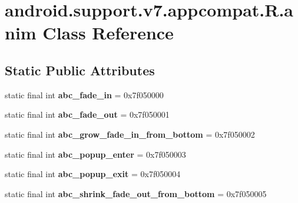 \hypertarget{classandroid_1_1support_1_1v7_1_1appcompat_1_1_r_1_1anim}{}\section{android.\+support.\+v7.\+appcompat.\+R.\+anim Class Reference}
\label{classandroid_1_1support_1_1v7_1_1appcompat_1_1_r_1_1anim}
\subsection*{Static Public Attributes}
\begin{DoxyCompactItemize}
\item 
\hypertarget{classandroid_1_1support_1_1v7_1_1appcompat_1_1_r_1_1anim_a665e81e9b94944163fe09d845ed3acb4}{}static final int {\bfseries abc\+\_\+fade\+\_\+in} = 0x7f050000\label{classandroid_1_1support_1_1v7_1_1appcompat_1_1_r_1_1anim_a665e81e9b94944163fe09d845ed3acb4}

\item 
\hypertarget{classandroid_1_1support_1_1v7_1_1appcompat_1_1_r_1_1anim_a9ee34f536803896c9ff3565989bbbeef}{}static final int {\bfseries abc\+\_\+fade\+\_\+out} = 0x7f050001\label{classandroid_1_1support_1_1v7_1_1appcompat_1_1_r_1_1anim_a9ee34f536803896c9ff3565989bbbeef}

\item 
\hypertarget{classandroid_1_1support_1_1v7_1_1appcompat_1_1_r_1_1anim_a453e567186301fd6de044b87e3895137}{}static final int {\bfseries abc\+\_\+grow\+\_\+fade\+\_\+in\+\_\+from\+\_\+bottom} = 0x7f050002\label{classandroid_1_1support_1_1v7_1_1appcompat_1_1_r_1_1anim_a453e567186301fd6de044b87e3895137}

\item 
\hypertarget{classandroid_1_1support_1_1v7_1_1appcompat_1_1_r_1_1anim_a4ebe12e5d55910691a4c025423c8c5c6}{}static final int {\bfseries abc\+\_\+popup\+\_\+enter} = 0x7f050003\label{classandroid_1_1support_1_1v7_1_1appcompat_1_1_r_1_1anim_a4ebe12e5d55910691a4c025423c8c5c6}

\item 
\hypertarget{classandroid_1_1support_1_1v7_1_1appcompat_1_1_r_1_1anim_a663ac7c42efa1a4de1cd936b6d98d894}{}static final int {\bfseries abc\+\_\+popup\+\_\+exit} = 0x7f050004\label{classandroid_1_1support_1_1v7_1_1appcompat_1_1_r_1_1anim_a663ac7c42efa1a4de1cd936b6d98d894}

\item 
\hypertarget{classandroid_1_1support_1_1v7_1_1appcompat_1_1_r_1_1anim_a9bfbcebac78098ea68cf7a159c4405f7}{}static final int {\bfseries abc\+\_\+shrink\+\_\+fade\+\_\+out\+\_\+from\+\_\+bottom} = 0x7f050005\label{classandroid_1_1support_1_1v7_1_1appcompat_1_1_r_1_1anim_a9bfbcebac78098ea68cf7a159c4405f7}


\end{DoxyCompactItemize}
